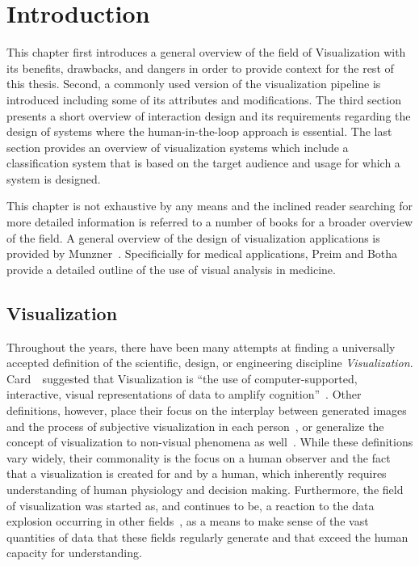 \chapter{Introduction} \label{cha:intro}
This chapter first introduces a general overview of the field of Visualization with its benefits, drawbacks, and dangers in order to provide context for the rest of this thesis.  Second, a commonly used version of the visualization pipeline is introduced including some of its attributes and modifications.  The third section presents a short overview of interaction design and its requirements regarding the design of systems where the human-in-the-loop approach is essential.  The last section provides an overview of visualization systems which include a classification system that is based on the target audience and usage for which a system is designed.

This chapter is not exhaustive by any means and the inclined reader searching for more detailed information is referred to a number of books for a broader overview of the field.  A general overview of the design of visualization applications is provided by Munzner~\cite{munzner2014visualization}.  Specificially for medical applications, Preim and Botha~\cite{preim2013visual} provide a detailed outline of the use of visual analysis in medicine.

\section{Visualization} \label{cha:intro:vis}
Throughout the years, there have been many attempts at finding a universally accepted definition of the scientific, design, or engineering discipline \emph{Visualization}.  Card~\etal~suggested that Visualization is ``the use of computer-supported, interactive, visual representations of data to amplify cognition''~\cite{card1999readings}.  Other definitions, however, place their focus on the interplay between generated images and the process of subjective visualization in each person~\cite{van2006views}, or generalize the concept of visualization to non-visual phenomena as well~\cite{ronnberg2016interactive}.  While these definitions vary widely, their commonality is the focus on a human observer and the fact that a visualization is created for and by a human, which inherently requires understanding of human physiology and decision making.  Furthermore, the field of visualization was started as, and continues to be, a reaction to the data explosion occurring in other fields~\cite{lorensen2004death}, as a means to make sense of the vast quantities of data that these fields regularly generate and that exceed the human capacity for understanding.

